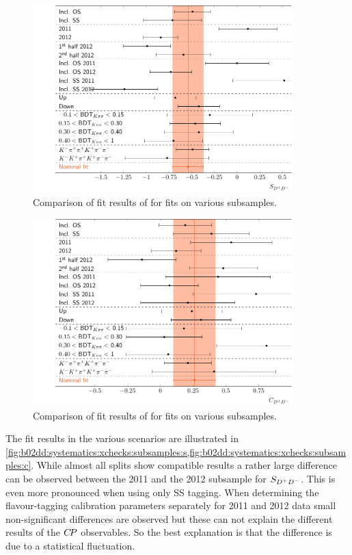 \begin{figure}[thb]
\centering
\includegraphics[width=0.9\textwidth]{07-B02DD/tikz/pdf/SComparison.pdf}
\caption{
Comparison of fit results of \SDD for fits on various subsamples.}
\label{fig:b02dd:systematics:xchecks:subsamples:s}
\end{figure}
\begin{figure}[thb]
\centering
\includegraphics[width=0.9\textwidth]{07-B02DD/tikz/pdf/CComparison.pdf}
\caption{
Comparison of fit results of \CDD for fits on various subsamples.}
\label{fig:b02dd:systematics:xchecks:subsamples:c}
\end{figure}
The fit results in the various scenarios are illustrated in
\cref{fig:b02dd:systematics:xchecks:subsamples:s,fig:b02dd:systematics:xchecks:subsamples:c}.
While almost all splits show compatible results a rather large difference can
be observed between the 2011 and the 2012 subsample for $S_{{{D}^+}{{D}^-}}$. This is even
more pronounced when using only SS tagging. When determining the
flavour-tagging calibration parameters separately for 2011 and 2012 data small
non-significant differences are observed but these can not explain the
different results of the ${C\!P}$ observables. So the best explanation is that
the difference is due to a statistical fluctuation.

